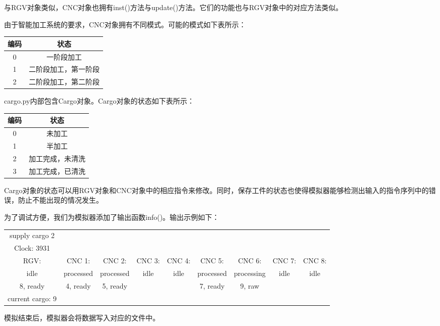 \documentclass{cumcmthesis}
\begin{document}
与RGV对象类似，CNC对象也拥有inst()方法与update()方法。它们的功能也与RGV对象中的对应方法类似。

由于智能加工系统的要求，CNC对象拥有不同模式。可能的模式如下表所示：

\begin{tabular}{c|c}
	\hline
	编码 & 状态 \\
	\hline
	0 & 一阶段加工 \\
	1 & 二阶段加工，第一阶段\\
	2 & 二阶段加工，第二阶段\\
	\hline
\end{tabular}

cargo.py内部包含Cargo对象。Cargo对象的状态如下表所示：

\begin{tabular}{c|c}
	\hline
	编码 & 状态 \\
	\hline
	0 & 未加工 \\
	1 & 半加工\\
	2 & 加工完成，未清洗\\
	3 & 加工完成，已清洗\\
	\hline
\end{tabular}

Cargo对象的状态可以用RGV对象和CNC对象中的相应指令来修改。同时，保存工件的状态也使得模拟器能够检测出输入的指令序列中的错误，防止不能出现的情况发生。

为了调试方便，我们为模拟器添加了输出函数info()。输出示例如下：

\begin{tabular}{ccccccccc}
	supply cargo 2 & & & & & & & & \\
	Clock: 3931 & & & & & & & & \\
	RGV:        & CNC 1:     & CNC 2:     & CNC 3:     & CNC 4:     & CNC 5:     & CNC 6:     & CNC 7:     & CNC 8: \\     
	idle       & processed  & processed  & idle       & idle       & processed  & processing & idle       & idle \\        
	8, ready   & 4, ready   & 5, ready   & & &  7, ready  &  9, raw & & \\                             
	current cargo: 9
\end{tabular}

模拟结束后，模拟器会将数据写入对应的文件中。
\end{document}
